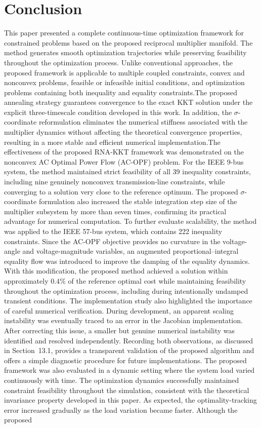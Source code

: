 \documentclass[11pt,onecolumn]{article}
\theoremstyle{definition}
\theoremstyle{remark}
\begin{document}
\section{Conclusion}

This paper presented a complete continuous-time optimization framework for constrained problems based on the proposed reciprocal multiplier manifold. The method generates smooth optimization trajectories while preserving feasibility throughout the optimization process. Unlike conventional approaches, the proposed framework is applicable to multiple coupled constraints, convex and nonconvex problems, feasible or infeasible initial conditions, and optimization problems containing both inequality and equality constraints.The proposed annealing strategy guarantees convergence to the exact KKT solution under the explicit three-timescale condition developed in this work. In addition, the $\sigma$-coordinate reformulation eliminates the numerical stiffness associated with the multiplier dynamics without affecting the theoretical convergence properties, resulting in a more stable and efficient numerical implementation.The effectiveness of the proposed RNA-KKT framework was demonstrated on the nonconvex AC Optimal Power Flow (AC-OPF) problem. For the IEEE 9-bus system, the method maintained strict feasibility of all 39 inequality constraints, including nine genuinely nonconvex transmission-line constraints, while converging to a solution very close to the reference optimum. The proposed $\sigma$-coordinate formulation also increased the stable integration step size of the multiplier subsystem by more than seven times, confirming its practical advantage for numerical computation. To further evaluate scalability, the method was applied to the IEEE 57-bus system, which contains 222 inequality constraints. Since the AC-OPF objective provides no curvature in the voltage-angle and voltage-magnitude variables, an augmented proportional--integral equality flow was introduced to improve the damping of the equality dynamics. With this modification, the proposed method achieved a solution within approximately $0.4\%$ of the reference optimal cost while maintaining feasibility throughout the optimization process, including during intentionally undamped transient conditions. The implementation study also highlighted the importance of careful numerical verification. During development, an apparent scaling instability was eventually traced to an error in the Jacobian implementation. After correcting this issue, a smaller but genuine numerical instability was identified and resolved independently. Recording both observations, as discussed in Section~13.1, provides a transparent validation of the proposed algorithm and offers a simple diagnostic procedure for future implementations. The proposed framework was also evaluated in a dynamic setting where the system load varied continuously with time. The optimization dynamics successfully maintained constraint feasibility throughout the simulation, consistent with the theoretical invariance property developed in this paper. As expected, the optimality-tracking error increased gradually as the load variation became faster. Although the proposed 
\end{document}
